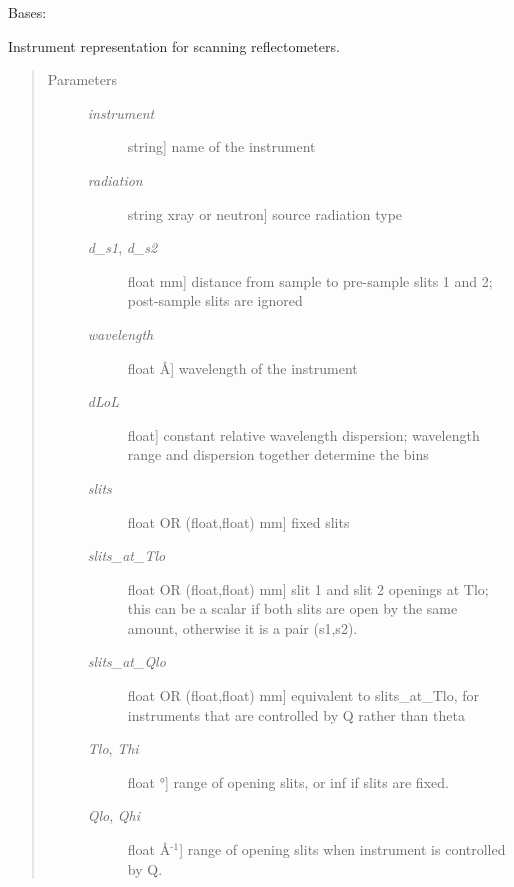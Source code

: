 \documentclass[letterpaper,10pt,english]{sphinxmanual}
\begin{document}
\begin{fulllineitems}
\label{api/instrument:refl1d.instrument.Monochromatic}
Bases: 

Instrument representation for scanning reflectometers.
\begin{quote}\begin{description}
\item[{Parameters }] \leavevmode\begin{description}
\item[{\emph{instrument}}] \leavevmode{[}string{]}
name of the instrument

\item[{\emph{radiation}}] \leavevmode{[}string \textbar{} xray or neutron{]}
source radiation type

\item[{\emph{d\_s1}, \emph{d\_s2}}] \leavevmode{[}float \textbar{} mm{]}
distance from sample to pre-sample slits 1 and 2; post-sample
slits are ignored

\item[{\emph{wavelength}}] \leavevmode{[}float \textbar{} Å{]}
wavelength of the instrument

\item[{\emph{dLoL}}] \leavevmode{[}float{]}
constant relative wavelength dispersion; wavelength range and
dispersion together determine the bins

\item[{\emph{slits}}] \leavevmode{[}float OR (float,float) \textbar{} mm{]}
fixed slits

\item[{\emph{slits\_at\_Tlo}}] \leavevmode{[}float OR (float,float) \textbar{} mm{]}
slit 1 and slit 2 openings at Tlo; this can be a scalar if both
slits are open by the same amount, otherwise it is a pair (s1,s2).

\item[{\emph{slits\_at\_Qlo}}] \leavevmode{[}float OR (float,float) \textbar{} mm{]}
equivalent to slits\_at\_Tlo, for instruments that are controlled by
Q rather than theta

\item[{\emph{Tlo}, \emph{Thi}}] \leavevmode{[}float \textbar{} °{]}
range of opening slits, or inf if slits are fixed.

\item[{\emph{Qlo}, \emph{Qhi}}] \leavevmode{[}float \textbar{} Å$^{\text{-1}}${]}
range of opening slits when instrument is controlled by Q.


\end{description}
\end{description}
\end{quote}
\end{fulllineitems}
\end{document}
